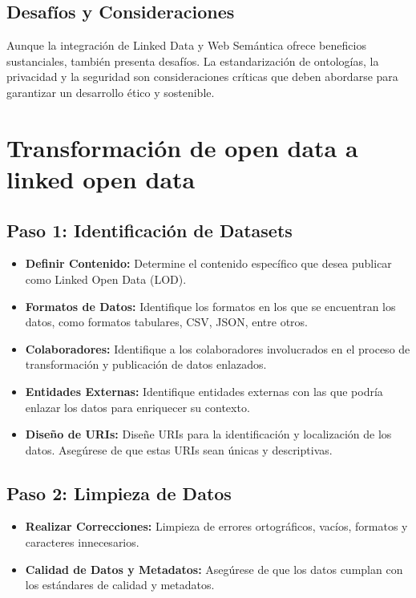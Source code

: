 \documentclass[11pt]{report}
\begin{document}
	\section*{Desafíos y Consideraciones}
	
	Aunque la integración de Linked Data y Web Semántica ofrece beneficios sustanciales, también presenta desafíos. La estandarización de ontologías, la privacidad y la seguridad son consideraciones críticas que deben abordarse para garantizar un desarrollo ético y sostenible.
	
	\chapter{Transformación de open data a linked open data}
		  \section{Paso 1: Identificación de Datasets}

		  \begin{itemize}
			\item \textbf{Definir Contenido:} Determine el contenido específico que desea publicar como Linked Open Data (LOD).
			
			\item \textbf{Formatos de Datos:} Identifique los formatos en los que se encuentran los datos, como formatos tabulares, CSV, JSON, entre otros.
			
			\item \textbf{Colaboradores:} Identifique a los colaboradores involucrados en el proceso de transformación y publicación de datos enlazados.
			
			\item \textbf{Entidades Externas:} Identifique entidades externas con las que podría enlazar los datos para enriquecer su contexto.
			
			\item \textbf{Diseño de URIs:} Diseñe URIs para la identificación y localización de los datos. Asegúrese de que estas URIs sean únicas y descriptivas.
		\end{itemize}	
		\section{Paso 2: Limpieza de Datos}
			\begin{itemize}
			\item \textbf{Realizar Correcciones:} Limpieza de errores ortográficos, vacíos, formatos y caracteres innecesarios.
			
			\item \textbf{Calidad de Datos y Metadatos:} Asegúrese de que los datos cumplan con los estándares de calidad y metadatos.
			\end{itemize}		
\end{document}
